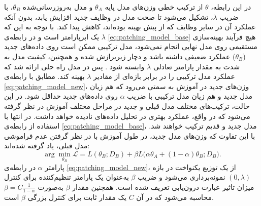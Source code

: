 در این رابطه، $\theta$ از ترکیب خطی وزن‌های مدل پایه $\theta_A$ و مدل به‌روزرسانی‌شده $\theta_B$، با ضریب $\lambda$، تشکیل می‌شود تا صحت مدل در وظایف جدید افزایش یابد، بدون آنکه عملکرد آن در سایر وظایف که از پیش بهینه بوده‌اند، کاهش پیدا کند. با توجه به این که $\lambda$ یک ابرپارامتر است و در رابطه‌ی \eqref{eq:patching_model_base} هیچ فرآیند بهینه‌سازی مستقیمی روی مدل نهایی انجام نمی‌شود، مدل ترکیبی ممکن است روی داده‌های جدید ($\theta_B$) عملکرد ضعیفی داشته باشد و دچار زیر‌برازش شده و همچنین، کیفیت مدل به شدت به مقدار پارامتر تعادلی $\lambda$ وابسته شود \cite{open-vclip}. پس در مدل  راه حلی ارائه شد که عملکرد مدل ترکیبی را در برابر بازه‌ای از مقادیر $\lambda$ بهینه کند. مطابق با رابطه‌ی \eqref{eq:patching_model_new}، وزن‌های جدید در آموزش به سمتی می‌رود که هم زیان مدل جدید و هم زیان مدل ترکیبی با ضریب $\alpha$ روی داده‌های جدید حداقل شود. در این حالت، ترکیب‌های مختلف مدل قبلی و جدید در مراحل مختلف آموزش در نظر گرفته می‌شود که در واقع، عملکرد بهتری در تحلیل داده‌های نادیده خواهد داشت. در انتها با استفاده از رابطه‌ی \eqref{eq:patching_model_base}، مدل جدید و قدیم ترکیب خواهند شد. با این تفاوت که وزن‌های مدل جدید، در طول آموزش با در نظر گرفتن عدم فراموشی مدل قبلی، یاد گرفته شده‌اند:
\begin{equation}\label{eq:patching_model_new}
	\arg \min_{\theta_B} \mathcal{L} =
	L(\theta_B; D_B) + \beta L\big(\alpha \theta_A + (1 - \alpha)\theta_B; D_B\big).
\end{equation}
پارامتر \( \alpha \) در رابطه‌ی \eqref{eq:patching_model_new}، از یک توزیع یکنواخت در بازه \( (0, \lambda) \) نمونه‌برداری می‌شود و ضریب \( \beta \) به‌عنوان یک پارامتر تنظیم‌کننده برای کنترل میزان تاثیر عبارت درون‌یابی تعریف شده است. همچنین مقدار \( \beta \) به‌صورت \( \beta = C \frac{1}{1 - \alpha} \) محاسبه می‌شود که در آن \( C \) یک مقدار ثابت برای کنترل بزرگی \(\beta\) است. 

